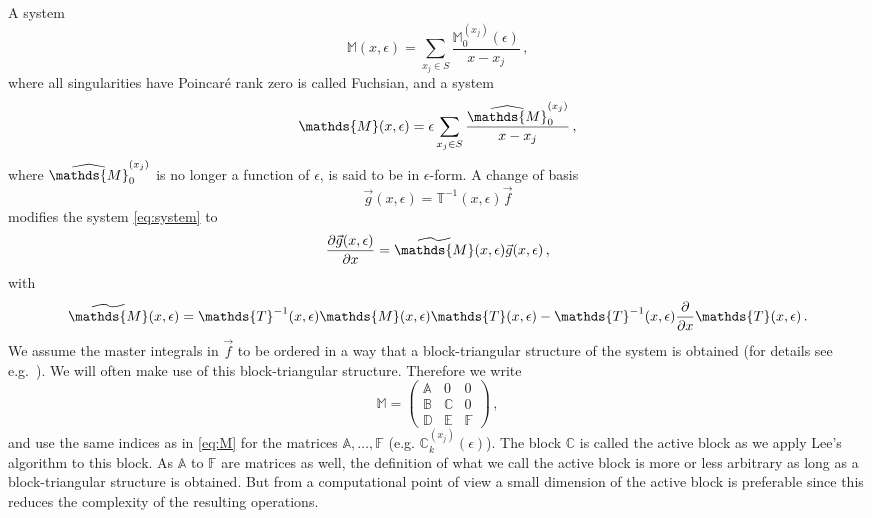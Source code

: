 \documentclass[12pt]{article}
\numberwithin{equation}{section}
\numberwithin{figure}{section}
\newcommand{\M}{\mathds{M}}
\newcommand{\A}{\mathds{A}}
\newcommand{\B}{\mathds{B}}
\newcommand{\C}{\mathds{C}}
\newcommand{\D}{\mathds{D}}
\newcommand{\E}{\mathds{E}}
\newcommand{\F}{\mathds{F}}
\newcommand{\T}{\mathds{T}}
\begin{document}
      A system
      \begin{equation} \label{eq:fuchsian}
        \M(x,\epsilon) 
        = 
        \sum\limits_{x_j \in S} 
        \frac{\M^{(x_j)}_0(\epsilon)}{x-x_j}\,,
      \end{equation}
      where all singularities have Poincar\'{e} rank zero is called Fuchsian, and a system
      \begin{equation} \label{eq:epform}
        \M(x,\epsilon) 
        = 
        \epsilon \sum\limits_{x_j \in S} 
        \frac{\widehat\M^{(x_j)}_0}{x-x_j}\,,
      \end{equation}
      where $\widehat\M^{(x_j)}_0$ is no longer a function of $\epsilon$, is said to be in $\epsilon$-form.
      A change of basis
      \[
        \vec{g}(x,\epsilon) = \T^{-1}(x,\epsilon) \vec{f}
      \]
      modifies the system \eqref{eq:system} to 
      \[
        \frac{\partial \vec{g}(x,\epsilon)}{\partial x} 
        = 
        \widetilde\M(x,\epsilon) \vec{g}(x,\epsilon)\,,
      \]
      with
      \begin{equation} \label{eq:trans}
        \widetilde\M(x,\epsilon)
        =
        \T^{-1}(x,\epsilon)
        \M(x,\epsilon)
        \T(x,\epsilon)
        -
        \T^{-1}(x,\epsilon)
        \frac{\partial}{\partial x}
        \T(x,\epsilon)\,.
      \end{equation}
      We assume the master integrals in $\vec{f}$ to be ordered in a way that a block-triangular structure of the system is obtained (for details see e.g.~\cite{Lee:2014ioa}).
      We will often make use of this block-triangular structure.
      Therefore we write
      \begin{equation} \label{eq:triangular}
        \M
        =
        \begin{pmatrix}
          \A & 0 & 0 \\
          \B & \C & 0 \\
          \D & \E & \F
        \end{pmatrix}\,,
      \end{equation}
      and use the same indices as in \eqref{eq:M} for the matrices $\A,\dots,\F$ (e.g. $\C^{(x_j)}_k(\epsilon)$).
      The block $\C$ is called the active block as we apply Lee's algorithm to this block.
      As $\A$ to $\F$ are matrices as well, the definition of what we call the active block is more or less arbitrary as long as a block-triangular structure is obtained.
      But from a computational point of view a small dimension of the active block is preferable since this reduces the complexity of the resulting operations.
\end{document}
